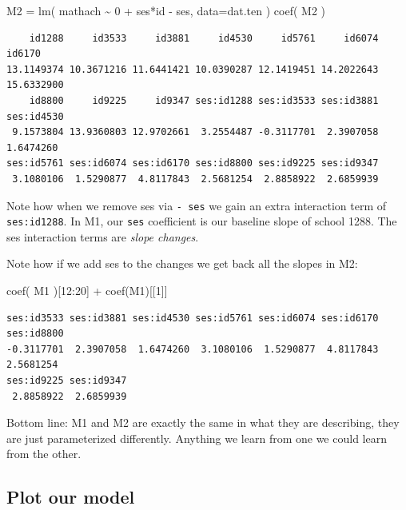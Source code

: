\documentclass[
  letterpaper,
  DIV=11,
  numbers=noendperiod]{scrreprt}
\newenvironment{Shaded}{}{}
\newcommand{\AttributeTok}[1]{\textcolor[rgb]{0.49,0.56,0.16}{#1}}
\newcommand{\DecValTok}[1]{\textcolor[rgb]{0.25,0.63,0.44}{#1}}
\newcommand{\FunctionTok}[1]{\textcolor[rgb]{0.02,0.16,0.49}{#1}}
\newcommand{\NormalTok}[1]{#1}
\newcommand{\OtherTok}[1]{\textcolor[rgb]{0.00,0.44,0.13}{#1}}
\newcommand{\SpecialCharTok}[1]{\textcolor[rgb]{0.25,0.44,0.63}{#1}}
\begin{document}
\begin{Shaded}
\begin{Highlighting}[]
\NormalTok{M2 }\OtherTok{=} \FunctionTok{lm}\NormalTok{( mathach }\SpecialCharTok{\textasciitilde{}} \DecValTok{0} \SpecialCharTok{+}\NormalTok{ ses}\SpecialCharTok{*}\NormalTok{id }\SpecialCharTok{{-}}\NormalTok{ ses, }\AttributeTok{data=}\NormalTok{dat.ten )}
\FunctionTok{coef}\NormalTok{( M2 )}
\end{Highlighting}
\end{Shaded}

\begin{verbatim}
    id1288     id3533     id3881     id4530     id5761     id6074     id6170 
13.1149374 10.3671216 11.6441421 10.0390287 12.1419451 14.2022643 15.6332900 
    id8800     id9225     id9347 ses:id1288 ses:id3533 ses:id3881 ses:id4530 
 9.1573804 13.9360803 12.9702661  3.2554487 -0.3117701  2.3907058  1.6474260 
ses:id5761 ses:id6074 ses:id6170 ses:id8800 ses:id9225 ses:id9347 
 3.1080106  1.5290877  4.8117843  2.5681254  2.8858922  2.6859939 
\end{verbatim}

Note how when we remove ses via \texttt{-\ ses} we gain an extra
interaction term of \texttt{ses:id1288}. In M1, our \texttt{ses}
coefficient is our baseline slope of school 1288. The ses interaction
terms are \emph{slope changes}.

Note how if we add ses to the changes we get back all the slopes in M2:

\begin{Shaded}
\begin{Highlighting}[]
\FunctionTok{coef}\NormalTok{( M1 )[}\DecValTok{12}\SpecialCharTok{:}\DecValTok{20}\NormalTok{] }\SpecialCharTok{+} \FunctionTok{coef}\NormalTok{(M1)[[}\DecValTok{1}\NormalTok{]]}
\end{Highlighting}
\end{Shaded}

\begin{verbatim}
ses:id3533 ses:id3881 ses:id4530 ses:id5761 ses:id6074 ses:id6170 ses:id8800 
-0.3117701  2.3907058  1.6474260  3.1080106  1.5290877  4.8117843  2.5681254 
ses:id9225 ses:id9347 
 2.8858922  2.6859939 
\end{verbatim}

Bottom line: M1 and M2 are exactly the same in what they are describing,
they are just parameterized differently. Anything we learn from one we
could learn from the other.

\subsection{Plot our model}\label{plot-our-model}
\end{document}
